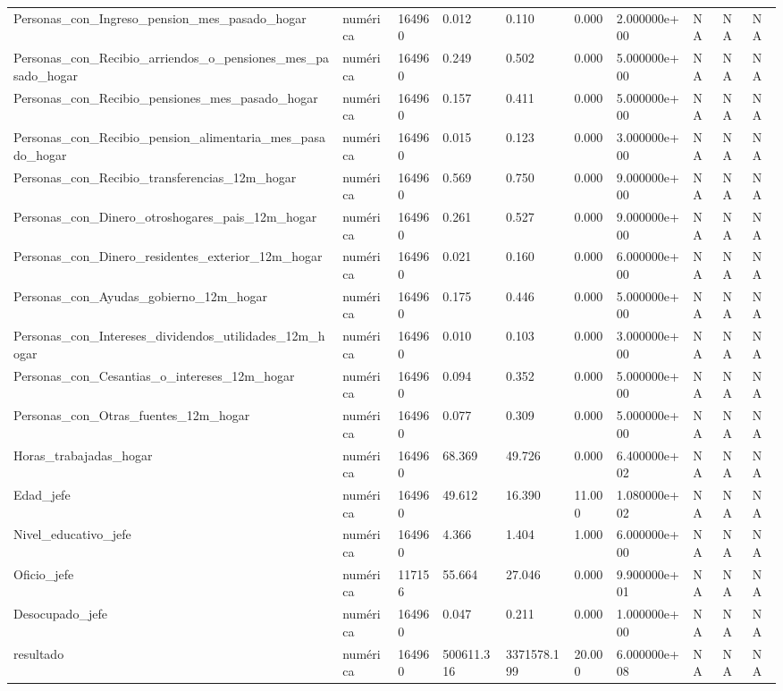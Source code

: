 \begin{longtable}[t]{llllllllll}
Personas\_con\_Ingreso\_pension\_mes\_pasado\_hogar & numérica & 164960 & 0.012 & 0.110 & 0.000 & 2.000000e+00 & NA & NA & NA\\
Personas\_con\_Recibio\_arriendos\_o\_pensiones\_mes\_pasado\_hogar & numérica & 164960 & 0.249 & 0.502 & 0.000 & 5.000000e+00 & NA & NA & NA\\
Personas\_con\_Recibio\_pensiones\_mes\_pasado\_hogar & numérica & 164960 & 0.157 & 0.411 & 0.000 & 5.000000e+00 & NA & NA & NA\\
Personas\_con\_Recibio\_pension\_alimentaria\_mes\_pasado\_hogar & numérica & 164960 & 0.015 & 0.123 & 0.000 & 3.000000e+00 & NA & NA & NA\\
Personas\_con\_Recibio\_transferencias\_12m\_hogar & numérica & 164960 & 0.569 & 0.750 & 0.000 & 9.000000e+00 & NA & NA & NA\\
Personas\_con\_Dinero\_otroshogares\_pais\_12m\_hogar & numérica & 164960 & 0.261 & 0.527 & 0.000 & 9.000000e+00 & NA & NA & NA\\
Personas\_con\_Dinero\_residentes\_exterior\_12m\_hogar & numérica & 164960 & 0.021 & 0.160 & 0.000 & 6.000000e+00 & NA & NA & NA\\
Personas\_con\_Ayudas\_gobierno\_12m\_hogar & numérica & 164960 & 0.175 & 0.446 & 0.000 & 5.000000e+00 & NA & NA & NA\\
Personas\_con\_Intereses\_dividendos\_utilidades\_12m\_hogar & numérica & 164960 & 0.010 & 0.103 & 0.000 & 3.000000e+00 & NA & NA & NA\\
Personas\_con\_Cesantias\_o\_intereses\_12m\_hogar & numérica & 164960 & 0.094 & 0.352 & 0.000 & 5.000000e+00 & NA & NA & NA\\
Personas\_con\_Otras\_fuentes\_12m\_hogar & numérica & 164960 & 0.077 & 0.309 & 0.000 & 5.000000e+00 & NA & NA & NA\\
Horas\_trabajadas\_hogar & numérica & 164960 & 68.369 & 49.726 & 0.000 & 6.400000e+02 & NA & NA & NA\\
Edad\_jefe & numérica & 164960 & 49.612 & 16.390 & 11.000 & 1.080000e+02 & NA & NA & NA\\
Nivel\_educativo\_jefe & numérica & 164960 & 4.366 & 1.404 & 1.000 & 6.000000e+00 & NA & NA & NA\\
Oficio\_jefe & numérica & 117156 & 55.664 & 27.046 & 0.000 & 9.900000e+01 & NA & NA & NA\\
Desocupado\_jefe & numérica & 164960 & 0.047 & 0.211 & 0.000 & 1.000000e+00 & NA & NA & NA\\
resultado & numérica & 164960 & 500611.316 & 3371578.199 & 20.000 & 6.000000e+08 & NA & NA & NA\\

\end{longtable}
